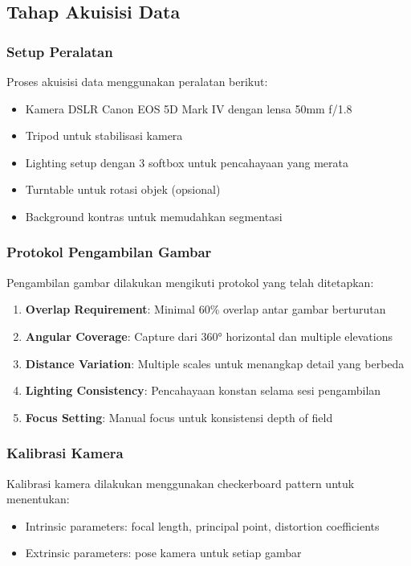 \documentclass[12pt,a4paper]{article}
\begin{document}
\subsection{Tahap Akuisisi Data}

\subsubsection{Setup Peralatan}

Proses akuisisi data menggunakan peralatan berikut:
\begin{itemize}
    \item Kamera DSLR Canon EOS 5D Mark IV dengan lensa 50mm f/1.8
    \item Tripod untuk stabilisasi kamera
    \item Lighting setup dengan 3 softbox untuk pencahayaan yang merata
    \item Turntable untuk rotasi objek (opsional)
    \item Background kontras untuk memudahkan segmentasi
\end{itemize}

\subsubsection{Protokol Pengambilan Gambar}

Pengambilan gambar dilakukan mengikuti protokol yang telah ditetapkan:

\begin{enumerate}
    \item \textbf{Overlap Requirement}: Minimal 60\% overlap antar gambar berturutan
    \item \textbf{Angular Coverage}: Capture dari 360° horizontal dan multiple elevations
    \item \textbf{Distance Variation}: Multiple scales untuk menangkap detail yang berbeda
    \item \textbf{Lighting Consistency}: Pencahayaan konstan selama sesi pengambilan
    \item \textbf{Focus Setting}: Manual focus untuk konsistensi depth of field
\end{enumerate}

\subsubsection{Kalibrasi Kamera}

Kalibrasi kamera dilakukan menggunakan checkerboard pattern untuk menentukan:
\begin{itemize}
    \item Intrinsic parameters: focal length, principal point, distortion coefficients
    \item Extrinsic parameters: pose kamera untuk setiap gambar
\end{itemize}
\end{document}
